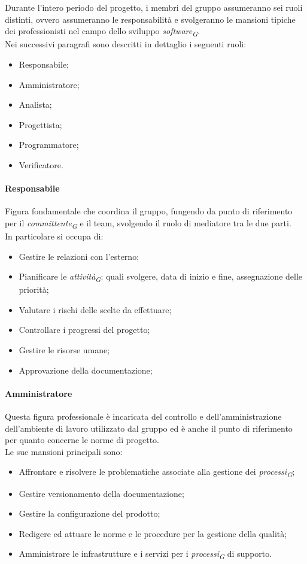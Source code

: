 Durante l'intero periodo del progetto, i membri del gruppo assumeranno sei ruoli distinti, ovvero assumeranno le responsabilità e svolgeranno le mansioni tipiche dei professionisti nel campo dello sviluppo \textit{software}\textsubscript{\textit{G}}. \\
Nei successivi paragrafi sono descritti in dettaglio i seguenti ruoli:
\begin{itemize}
  \item Responsabile;
  \item Amministratore;
  \item Analista;
  \item Progettista;
  \item Programmatore;
  \item Verificatore.
\end{itemize}

\paragraph{Responsabile}\label{responsabile} Figura fondamentale che coordina il gruppo, fungendo da punto di riferimento per il \textit{committente}\textsubscript{\textit{G}} e il team, svolgendo il ruolo di mediatore tra le due parti. \\
In particolare si occupa di:
\begin{itemize}
    \item Gestire le relazioni con l'esterno;
    \item Pianificare le \textit{attività}\textsubscript{\textit{G}}: quali svolgere, data di inizio e fine, assegnazione delle priorità;
    \item Valutare i rischi delle scelte da effettuare;
    \item Controllare i progressi del progetto;
    \item Gestire le risorse umane;
    \item Approvazione della documentazione;
\end{itemize}

\paragraph{Amministratore}\label{amministratore}Questa figura professionale è incaricata del controllo e dell'amministrazione dell'ambiente di lavoro utilizzato dal gruppo ed è anche il punto di riferimento per quanto concerne le norme di progetto. \\
Le sue mansioni principali sono:
\begin{itemize}
    \item Affrontare e risolvere le problematiche associate alla gestione dei \textit{processi}\textsubscript{\textit{G}};
    \item Gestire versionamento della documentazione;
    \item Gestire la configurazione del prodotto;
    \item Redigere ed attuare le norme e le procedure per la gestione della qualità;
    \item Amministrare le infrastrutture e i servizi per i \textit{processi}\textsubscript{\textit{G}} di supporto.
\end{itemize}

